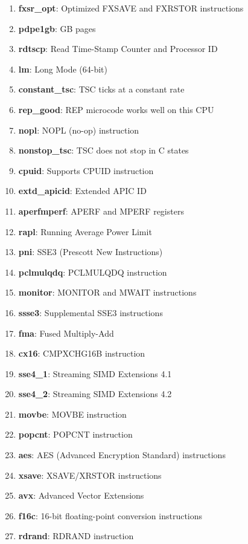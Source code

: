 \begin{multicols}{2}
\begin{enumerate}
        \item \textbf{fxsr\_opt}: Optimized FXSAVE and FXRSTOR instructions
        \item \textbf{pdpe1gb}: GB pages
        \item \textbf{rdtscp}: Read Time-Stamp Counter and Processor ID
        \item \textbf{lm}: Long Mode (64-bit)
        \item \textbf{constant\_tsc}: TSC ticks at a constant rate
        \item \textbf{rep\_good}: REP microcode works well on this CPU
        \item \textbf{nopl}: NOPL (no-op) instruction
        \item \textbf{nonstop\_tsc}: TSC does not stop in C states
        \item \textbf{cpuid}: Supports CPUID instruction
        \item \textbf{extd\_apicid}: Extended APIC ID
        \item \textbf{aperfmperf}: APERF and MPERF registers
        \item \textbf{rapl}: Running Average Power Limit
        \item \textbf{pni}: SSE3 (Prescott New Instructions)
        \item \textbf{pclmulqdq}: PCLMULQDQ instruction
        \item \textbf{monitor}: MONITOR and MWAIT instructions
        \item \textbf{ssse3}: Supplemental SSE3 instructions
        \item \textbf{fma}: Fused Multiply-Add
        \item \textbf{cx16}: CMPXCHG16B instruction
        \item \textbf{sse4\_1}: Streaming SIMD Extensions 4.1
        \item \textbf{sse4\_2}: Streaming SIMD Extensions 4.2
        \item \textbf{movbe}: MOVBE instruction
        \item \textbf{popcnt}: POPCNT instruction
        \item \textbf{aes}: AES (Advanced Encryption Standard) instructions
        \item \textbf{xsave}: XSAVE/XRSTOR instructions
        \item \textbf{avx}: Advanced Vector Extensions
        \item \textbf{f16c}: 16-bit floating-point conversion instructions
        \item \textbf{rdrand}: RDRAND instruction

\end{enumerate}
\end{multicols}
